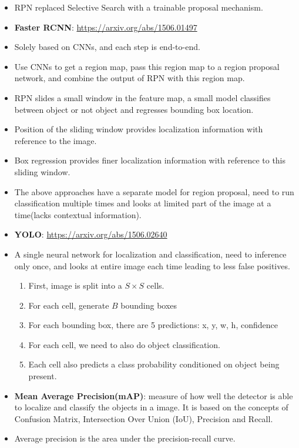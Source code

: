 \documentclass[a4paper]{article}
\begin{document}
\begin{itemize}
    \item RPN replaced Selective Search with a trainable proposal mechanism.
    \item \textbf{Faster RCNN}: \url{https://arxiv.org/abs/1506.01497}
    \item Solely based on CNNs, and each step is end-to-end.
    \item Use CNNs to get a region map, pass this region map to a region proposal network, and combine the output of RPN with this region map.
    \item RPN slides a small window in the feature map, a small model classifies between object or not object and regresses bounding box location.
    \item Position of the sliding window provides localization information with reference to the image.
    \item Box regression provides finer localization information with reference to this sliding window.
    \item The above approaches have a separate model for region proposal, need to run classification multiple times and looks at limited part of the image at a time(lacks contextual information).
    \item \textbf{YOLO}: \url{https://arxiv.org/abs/1506.02640}
    \item A single neural network for localization and classification, need to inference only once, and looks at entire image each time leading to less false positives.
    \begin{enumerate}
        \item First, image is split into a $S\times S$ cells.
        \item For each cell, generate $B$ bounding boxes
        \item For each bounding box, there are 5 predictions: x, y, w, h, confidence
        \item For each cell, we need to also do object classification.
        \item Each cell also predicts a class probability conditioned on object being present.
    \end{enumerate}
    \item \textbf{Mean Average Precision(mAP)}: measure of how well the detector is able to localize and classify the objects in a image. It is based on the concepts of Confusion Matrix, Intersection Over Union (IoU), Precision and Recall.
    \item Average precision is the area under the precision-recall curve.

\end{itemize}
\end{document}
